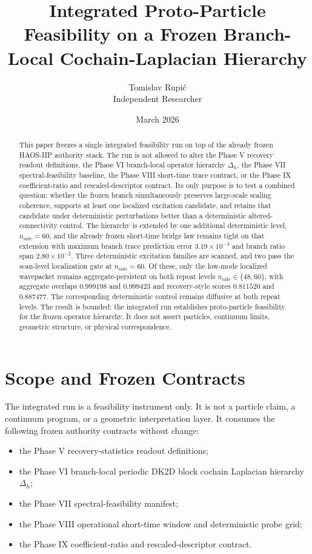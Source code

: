\documentclass[11pt]{article}
\title{Integrated Proto-Particle Feasibility on a Frozen Branch-Local Cochain-Laplacian Hierarchy}
\author{Tomislav Rupi\'c \\ Independent Researcher}
\date{March 2026}
\begin{document}
\maketitle

\begin{abstract}
This paper freezes a single integrated feasibility run on top of the already frozen HAOS-IIP authority stack. The run is not allowed to alter the Phase V recovery readout definitions, the Phase VI branch-local operator hierarchy $\Delta_h$, the Phase VII spectral-feasibility baseline, the Phase VIII short-time trace contract, or the Phase IX coefficient-ratio and rescaled-descriptor contract. Its only purpose is to test a combined question: whether the frozen branch simultaneously preserves large-scale scaling coherence, supports at least one localized excitation candidate, and retains that candidate under deterministic perturbations better than a deterministic altered-connectivity control. The hierarchy is extended by one additional deterministic level, $n_{\mathrm{side}} = 60$, and the already frozen short-time bridge law remains tight on that extension with maximum branch trace prediction error $3.19 \times 10^{-4}$ and branch ratio span $2.80 \times 10^{-2}$. Three deterministic excitation families are scanned, and two pass the scan-level localization gate at $n_{\mathrm{side}}=60$. Of these, only the low-mode localized wavepacket remains aggregate-persistent on both repeat levels $n_{\mathrm{side}} \in \{48,60\}$, with aggregate overlaps $0.999198$ and $0.999423$ and recovery-style scores $0.811520$ and $0.887477$. The corresponding deterministic control remains diffusive at both repeat levels. The result is bounded: the integrated run establishes proto-particle feasibility for the frozen operator hierarchy. It does not assert particles, continuum limits, geometric structure, or physical correspondence.
\end{abstract}

\section{Scope and Frozen Contracts}

The integrated run is a feasibility instrument only. It is not a particle claim, a continuum program, or a geometric interpretation layer. It consumes the following frozen authority contracts without change:
\begin{itemize}
\item the Phase V recovery-statistics readout definitions;
\item the Phase VI branch-local periodic DK2D block cochain Laplacian hierarchy $\Delta_h$;
\item the Phase VII spectral-feasibility manifest;
\item the Phase VIII operational short-time window and deterministic probe grid;
\item the Phase IX coefficient-ratio and rescaled-descriptor contract.
\end{itemize}
\end{document}
